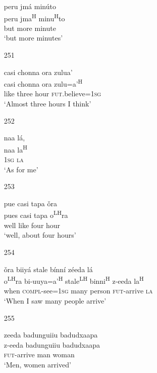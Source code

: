 \begin{itemize}
\glll  peru jm\'{a} min\'{u}to \\
peru jma\textsuperscript{H} minu\textsuperscript{H}to \\
but more minute \\
\glt `but more minutes'
 


\item[251]
 
\glll  casi chonna ora zulua' \\
casi chonna ora zulu=a'\textsuperscript{H} \\
like three hour \textsc{fut}.believe=\textsc{1sg} \\
\glt `Almost three hours I think'
 



\item[252]
 
\glll   naa l\'{a},  \\
 naa la\textsuperscript{H} \\
 \textsc{1sg} \textsc{la} \\
\glt `As for me'
 


\item[253]
 
\glll   pue casi tapa \v{o}ra   \\
pues casi tapa o\textsuperscript{LH}ra \\
 well like four hour \\
\glt `well, about four hours'
 


\item[254]
 
\glll   \v{o}ra biiy\'{a} stale b\'{i}nn\'{i} z\'{e}eda l\'{a} \\
o\textsuperscript{LH}ra bi-uuya=a'\textsuperscript{H} stale\textsuperscript{LH} binni\textsuperscript{H} z-eeda la\textsuperscript{H} \\
when \textsc{compl}-see=\textsc{1sg} many person \textsc{fut}-arrive \textsc{la} \\
\glt `When I saw many people arrive'
 


\item[255]
 
\glll   zeeda badunguiiu badudxaapa \\
z-eeda badunguiiu badudxaapa \\
\textsc{fut}-arrive man woman \\
\glt `Men, women arrived' 
 



\end{itemize}
